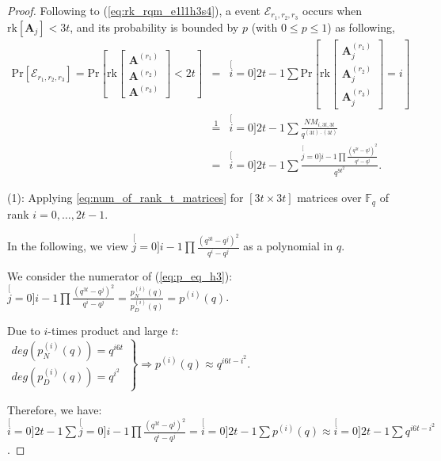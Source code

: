 \begin{proof}
Following to (\ref{eq:rk_rqm_e1l1h3s4}), a event $\mathcal{E}_{r_{1},r_{2},r_{3}}$
occurs when $\mathrm{rk}\left[\boldsymbol{A}_{j}\right]<3t$, and
its probability is bounded by $p$ (with $0\leq p\leq1$) as following,
\begin{eqnarray}
\mathrm{Pr}\left[\mathcal{E}_{r_{1},r_{2},r_{3}}\right]=\mathrm{Pr}\left[\mathrm{rk}\left[\begin{array}{c}
\boldsymbol{A}^{\left(r_{1}\right)}\\
\boldsymbol{A}^{\left(r_{2}\right)}\\
\boldsymbol{A}^{\left(r_{3}\right)}
\end{array}\right]<2t\right] & = & \stackrel[i=0]{2t-1}{\mathop{\sum}}\mathrm{Pr}\left[\mathrm{rk}\left[\begin{array}{c}
\boldsymbol{A}_{j}^{\left(r_{1}\right)}\\
\boldsymbol{A}_{j}^{\left(r_{2}\right)}\\
\boldsymbol{A}_{j}^{\left(r_{3}\right)}
\end{array}\right]=i\right]\label{eq:p_in_LLL}\\
 & \overset{1}{=} & \stackrel[i=0]{2t-1}{\mathop{\sum}}\frac{NM_{i,3t,3t}}{q^{\left(3t\right)\cdot\left(3t\right)}}\nonumber \\
 & = & \stackrel[i=0]{2t-1}{\mathop{\sum}}\frac{\stackrel[j=0]{i-1}{\mathop{\prod}}\frac{\left(q^{3t}-q^{j}\right)^{2}}{q^{i}-q^{j}}}{q^{9t^{2}}}.\label{eq:p_eq_h3}
\end{eqnarray}

(1): Applying \ref{eq:num_of_rank_t_matrices} for $\left[3t\times3t\right]$
matrices over $\ensuremath{\mathbb{F}}_{q}$ of rank $i=0,\ldots,2t-1$.

In the following, we view $\stackrel[j=0]{i-1}{\mathop{\prod}}\frac{\left(q^{3t}-q^{j}\right)^{2}}{q^{i}-q^{j}}$
as a polynomial in $q$.

We consider the numerator of (\ref{eq:p_eq_h3}): $\stackrel[j=0]{i-1}{\mathop{\prod}}\frac{\left(q^{3t}-q^{j}\right)^{2}}{q^{i}-q^{j}}=\frac{p_{N}^{(i)}(q)}{p_{D}^{(i)}(q)}=p^{(i)}(q)$.

Due to $i$-times product and large $t$: $\left.\begin{array}{c}
deg\left(p_{N}^{(i)}(q)\right)=q^{i6t}\\
deg\left(p_{D}^{(i)}(q)\right)=q^{i^{2}}
\end{array}\right\} \Rightarrow p^{(i)}(q)\approx q^{i6t-i^{2}}$.

Therefore, we have: $\stackrel[i=0]{2t-1}{\mathop{\sum}}\stackrel[j=0]{i-1}{\mathop{\prod}}\frac{\left(q^{3t}-q^{j}\right)^{2}}{q^{i}-q^{j}}=\stackrel[i=0]{2t-1}{\mathop{\sum}}p^{(i)}(q)\approx\stackrel[i=0]{2t-1}{\mathop{\sum}}q^{i6t-i^{2}}$.


\end{proof}
